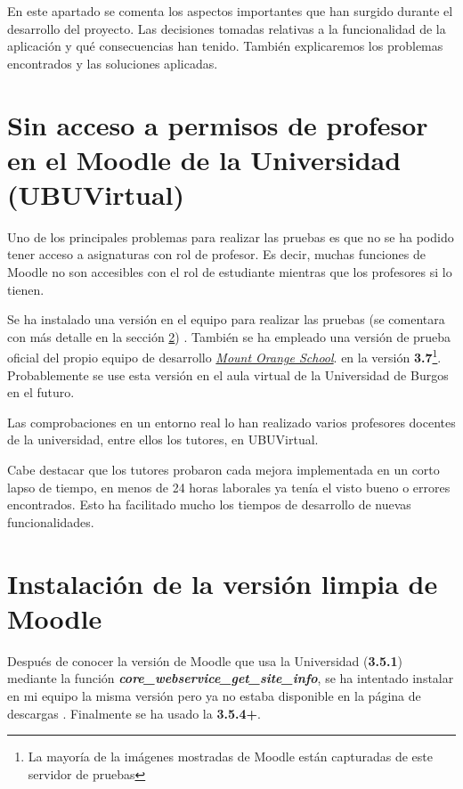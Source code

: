 
En este apartado se comenta los aspectos importantes que han surgido durante el desarrollo del proyecto. Las decisiones tomadas relativas a la funcionalidad de la aplicación y qué consecuencias han tenido. También explicaremos los problemas encontrados y las soluciones aplicadas.

\section{Sin acceso a permisos de profesor en el Moodle de la Universidad (UBUVirtual)}

Uno de los principales problemas para realizar las pruebas es que no se ha podido tener acceso a asignaturas con rol de profesor. Es decir, muchas funciones de Moodle no son accesibles con el rol de estudiante mientras que los profesores si lo tienen.


Se ha instalado una versión en el equipo para realizar las pruebas (se comentara con más detalle en la sección \ref{sec:instalacionMoodle}) . También se ha empleado una versión de prueba oficial del propio equipo de desarrollo \href{https://school.demo.moodle.net}{\textit{Mount Orange School}}.
 en la versión \textbf{3.7}\footnote{La mayoría de la imágenes mostradas de Moodle están capturadas de este servidor de pruebas}. Probablemente se use esta versión en el aula virtual de la Universidad de Burgos en el futuro.

Las comprobaciones en un entorno real lo han realizado varios profesores docentes de la universidad, entre ellos los tutores, en UBUVirtual. 

Cabe destacar que los tutores probaron cada mejora implementada en un corto lapso de tiempo, en menos de 24 horas laborales ya tenía el visto bueno o errores encontrados. Esto ha facilitado mucho los tiempos de desarrollo de nuevas funcionalidades.

\section{Instalación de la versión limpia de Moodle} \label{sec:instalacionMoodle}
Después de conocer la versión de Moodle que usa la Universidad (\textbf{3.5.1}) mediante  la función \textbf{\textit{core\_webservice\_get\_site\_info}}, se ha intentado instalar en mi equipo la misma versión pero ya no estaba disponible en la página de descargas \cite{noauthor_moodle_nodate}. Finalmente se ha usado la \textbf{3.5.4+}.


